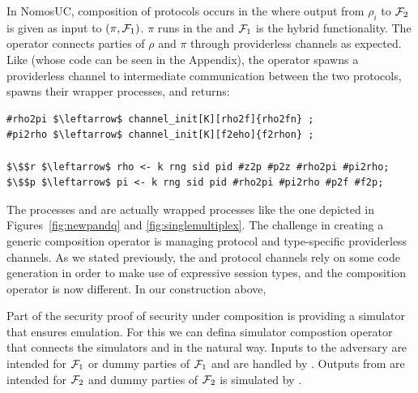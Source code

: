 In NomosUC, composition of protocols occurs in the \partywrapper where output from $\rho_i$ to $\mathcal{F}_2$ is given as input to $(\pi, \mathcal{F}_1)$. $\pi$ runs in the \partywrapper and $\mathcal{F}_1$ is the hybrid functionality. 
The operator connects parties of $\rho$ and $\pi$ through providerless channels as expected. 
Like  (whose code can be seen in the Appendix), the operator spawns a providerless channel to intermediate communication between the two protocols, spawns their wrapper processes, and returns:

\begin{lstlisting}[basicstyle=\footnotesize\BeraMonottFamily, mathescape, frame=single]
#rho2pi $\leftarrow$ channel_init[K][rho2f]{rho2fn} ;
#pi2rho $\leftarrow$ channel_init[K][f2eho]{f2rhon} ;

$\$$r $\leftarrow$ rho <- k rng sid pid #z2p #p2z #rho2pi #pi2rho; 
$\$$p $\leftarrow$ pi <- k rng sid pid #rho2pi #pi2rho #p2f #f2p;
\end{lstlisting}
The processes  and  are actually wrapped processes like the one depicted in Figures~\ref{fig:newpandq} and \ref{fig:singlemultiplex}.
The challenge in creating a generic composition operator is managing protocol and type-specific providerless channels.  
As we stated previously, the \partywrapper and protocol channels rely on some code generation in order to make use of expressive session types, and the composition operator is now different.
In our construction above, 


Part of the security proof of security under composition is providing a simulator that ensures emulation.
For this we can defina simulator compostion operator that connects the simulators \SIM{\rho} and \SIM{\pi} in the natural way. 
Inputs to the adversary are intended for $\mathcal{F}_1$ or dummy parties of $\mathcal{F}_1$ and are handled by \SIM{\pi}. Outputs from \SIM{\pi} are intended for $\mathcal{F}_2$ and dummy parties of $\mathcal{F}_2$ is simulated by \SIM{\rho}.


